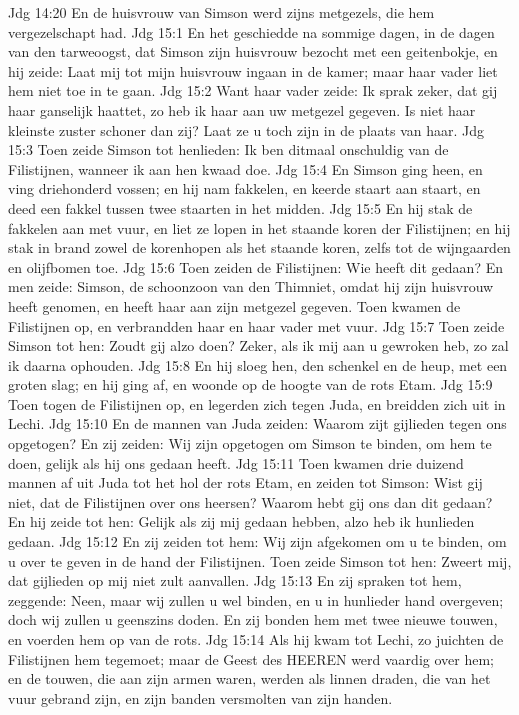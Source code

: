 Jdg 14:20  En de huisvrouw van Simson werd zijns metgezels, die hem vergezelschapt had.
Jdg 15:1  En het geschiedde na sommige dagen, in de dagen van den tarweoogst, dat Simson zijn huisvrouw bezocht met een geitenbokje, en hij zeide: Laat mij tot mijn huisvrouw ingaan in de kamer; maar haar vader liet hem niet toe in te gaan.
Jdg 15:2  Want haar vader zeide: Ik sprak zeker, dat gij haar ganselijk haattet, zo heb ik haar aan uw metgezel gegeven. Is niet haar kleinste zuster schoner dan zij? Laat ze u toch zijn in de plaats van haar.
Jdg 15:3  Toen zeide Simson tot henlieden: Ik ben ditmaal onschuldig van de Filistijnen, wanneer ik aan hen kwaad doe.
Jdg 15:4  En Simson ging heen, en ving driehonderd vossen; en hij nam fakkelen, en keerde staart aan staart, en deed een fakkel tussen twee staarten in het midden.
Jdg 15:5  En hij stak de fakkelen aan met vuur, en liet ze lopen in het staande koren der Filistijnen; en hij stak in brand zowel de korenhopen als het staande koren, zelfs tot de wijngaarden en olijfbomen toe.
Jdg 15:6  Toen zeiden de Filistijnen: Wie heeft dit gedaan? En men zeide: Simson, de schoonzoon van den Thimniet, omdat hij zijn huisvrouw heeft genomen, en heeft haar aan zijn metgezel gegeven. Toen kwamen de Filistijnen op, en verbrandden haar en haar vader met vuur.
Jdg 15:7  Toen zeide Simson tot hen: Zoudt gij alzo doen? Zeker, als ik mij aan u gewroken heb, zo zal ik daarna ophouden.
Jdg 15:8  En hij sloeg hen, den schenkel en de heup, met een groten slag; en hij ging af, en woonde op de hoogte van de rots Etam.
Jdg 15:9  Toen togen de Filistijnen op, en legerden zich tegen Juda, en breidden zich uit in Lechi.
Jdg 15:10  En de mannen van Juda zeiden: Waarom zijt gijlieden tegen ons opgetogen? En zij zeiden: Wij zijn opgetogen om Simson te binden, om hem te doen, gelijk als hij ons gedaan heeft.
Jdg 15:11  Toen kwamen drie duizend mannen af uit Juda tot het hol der rots Etam, en zeiden tot Simson: Wist gij niet, dat de Filistijnen over ons heersen? Waarom hebt gij ons dan dit gedaan? En hij zeide tot hen: Gelijk als zij mij gedaan hebben, alzo heb ik hunlieden gedaan.
Jdg 15:12  En zij zeiden tot hem: Wij zijn afgekomen om u te binden, om u over te geven in de hand der Filistijnen. Toen zeide Simson tot hen: Zweert mij, dat gijlieden op mij niet zult aanvallen.
Jdg 15:13  En zij spraken tot hem, zeggende: Neen, maar wij zullen u wel binden, en u in hunlieder hand overgeven; doch wij zullen u geenszins doden. En zij bonden hem met twee nieuwe touwen, en voerden hem op van de rots.
Jdg 15:14  Als hij kwam tot Lechi, zo juichten de Filistijnen hem tegemoet; maar de Geest des HEEREN werd vaardig over hem; en de touwen, die aan zijn armen waren, werden als linnen draden, die van het vuur gebrand zijn, en zijn banden versmolten van zijn handen.
